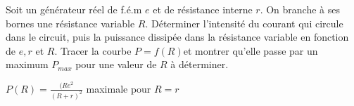\begin{Exercise}[title=Adaptation de puissance]
  Soit un générateur réel de f.é.m $e$ et de résistance interne
  $r$. On branche à ses bornes une résistance variable $R$.
  Déterminer l’intensité du courant qui circule dans le circuit, puis
  la puissance dissipée dans la résistance variable en fonction de
  $e,r$ et $R$. Tracer la courbe $P=f(R) $et montrer qu’elle passe par
  un maximum $P_{max}$ pour une valeur de $R$ à déterminer.
\end{Exercise}
\begin{Answer}
  $P(R)= \frac{(Re^2}{(R+r)^2}$ maximale pour $R=r$
\end{Answer}
